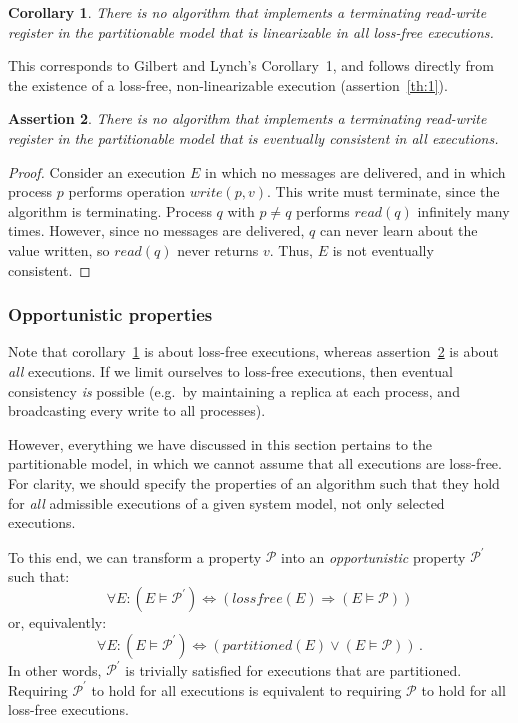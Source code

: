 \documentclass[fleqn,12pt,lineno]{wlpeerj} %
\newtheorem{theorem}{Assertion}
\newtheorem{corollary}[theorem]{Corollary}
\begin{document}
\begin{corollary}\label{corr:2}
There is no algorithm that implements a terminating read-write register in the partitionable model
that is linearizable in all loss-free executions.
\end{corollary}

This corresponds to Gilbert and Lynch's Corollary~1, and follows directly from the existence of a
loss-free, non-linearizable execution (assertion~\ref{th:1}).

\begin{theorem}\label{th:3}
There is no algorithm that implements a terminating read-write register in the partitionable model
that is eventually consistent in all executions.
\end{theorem}

\begin{proof}
Consider an execution $E$ in which no messages are delivered, and in which process $p$ performs
operation $\mathit{write}(p, v)$. This write must terminate, since the algorithm is terminating.
Process $q$ with $p \neq q$ performs $\mathit{read}(q)$ infinitely many times. However, since no
messages are delivered, $q$ can never learn about the value written, so $\mathit{read}(q)$ never
returns $v$. Thus, $E$ is not eventually consistent.
\end{proof}

\subsubsection{Opportunistic properties}

Note that corollary~\ref{corr:2} is about loss-free executions, whereas assertion~\ref{th:3} is
about \emph{all} executions. If we limit ourselves to loss-free executions, then eventual
consistency \emph{is} possible (e.g.\ by maintaining a replica at each process, and broadcasting
every write to all processes).

However, everything we have discussed in this section pertains to the partitionable model, in which
we cannot assume that all executions are loss-free. For clarity, we should specify the properties of
an algorithm such that they hold for \emph{all} admissible executions of a given system model, not
only selected executions.

To this end, we can transform a property $\mathcal{P}$ into an \emph{opportunistic} property
$\mathcal{P}^\prime$ such that:
$$\forall E \mathbin{:} (E \models \mathcal{P}^\prime) \Leftrightarrow (\mathit{lossfree}(E) \Rightarrow (E \models \mathcal{P}))$$
or, equivalently:
$$\forall E \mathbin{:} (E \models \mathcal{P}^\prime) \Leftrightarrow (\mathit{partitioned}(E) \vee (E \models \mathcal{P}))\,.$$
In other words, $\mathcal{P}^\prime$ is trivially satisfied for executions that are partitioned.
Requiring $\mathcal{P}^\prime$ to hold for all executions is equivalent to requiring $\mathcal{P}$
to hold for all loss-free executions.
\end{document}
